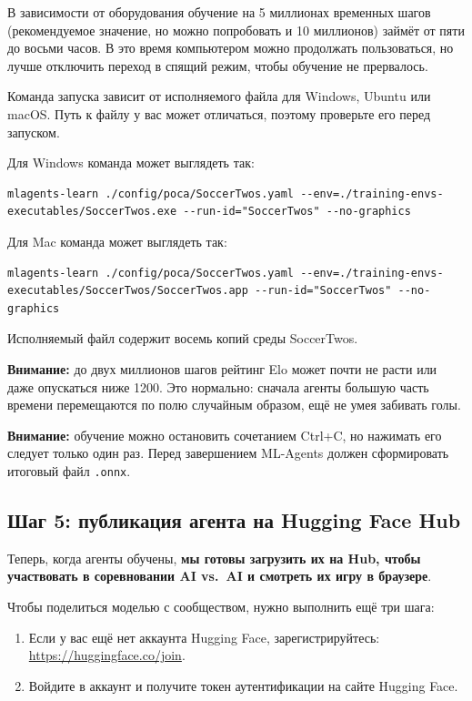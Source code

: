 \documentclass[11pt,a4paper]{article}
\begin{document}
В зависимости от оборудования обучение на 5 миллионах временных шагов (рекомендуемое значение, но можно попробовать и 10 миллионов) займёт от пяти до восьми часов. В это время компьютером можно продолжать пользоваться, но лучше отключить переход в спящий режим, чтобы обучение не прервалось.

Команда запуска зависит от исполняемого файла для Windows, Ubuntu или macOS. Путь к файлу у вас может отличаться, поэтому проверьте его перед запуском.

Для Windows команда может выглядеть так:

\begin{lstlisting}
mlagents-learn ./config/poca/SoccerTwos.yaml --env=./training-envs-executables/SoccerTwos.exe --run-id="SoccerTwos" --no-graphics
\end{lstlisting}

Для Mac команда может выглядеть так:

\begin{lstlisting}
mlagents-learn ./config/poca/SoccerTwos.yaml --env=./training-envs-executables/SoccerTwos/SoccerTwos.app --run-id="SoccerTwos" --no-graphics
\end{lstlisting}

Исполняемый файл содержит восемь копий среды SoccerTwos.

\textbf{Внимание:} до двух миллионов шагов рейтинг Elo может почти не расти или даже опускаться ниже 1200. Это нормально: сначала агенты большую часть времени перемещаются по полю случайным образом, ещё не умея забивать голы.

\textbf{Внимание:} обучение можно остановить сочетанием Ctrl+C, но нажимать его следует только один раз. Перед завершением ML-Agents должен сформировать итоговый файл \texttt{.onnx}.

\subsection{Шаг 5: публикация агента на Hugging Face Hub}\label{step-5-push-the-agent-to-the-hugging-face-hub}

Теперь, когда агенты обучены, \textbf{мы готовы загрузить их на Hub, чтобы участвовать в соревновании AI vs.~AI и смотреть их игру в браузере}.

Чтобы поделиться моделью с сообществом, нужно выполнить ещё три шага:

\begin{enumerate}
\def\labelenumi{\arabic{enumi}.}
\item
  Если у вас ещё нет аккаунта Hugging Face, зарегистрируйтесь: \url{https://huggingface.co/join}.
\item
  Войдите в аккаунт и получите токен аутентификации на сайте Hugging Face.
\end{enumerate}
\end{document}
